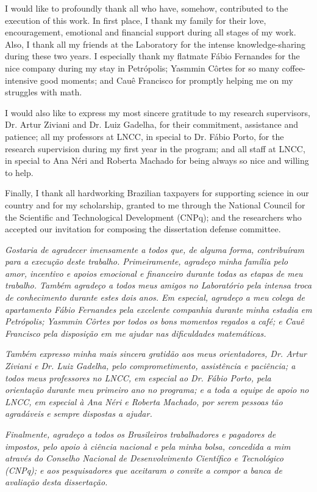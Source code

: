 \documentclass[
	12pt,				%
	openright,			%
	oneside,			%
	a4paper,			%
	sumario=tradicional,%
	french,				%
	spanish,			%
	brazil,				%
    english
	]{abntex2}
\begin{document}
\begin{agradecimentos}
I would like to profoundly thank all who have, somehow, contributed to the execution of this work.
In first place, I thank my family for their love, encouragement, emotional and financial support during all stages of my work.
Also, I thank all my friends at the Laboratory for the intense knowledge-sharing during these two years.
I especially thank my flatmate Fábio Fernandes for the nice company during my stay in Petrópolis; 
Yasmmin Côrtes for so many coffee-intensive good moments; 
and Cauê Francisco for promptly helping me on my struggles with math.

I would also like to express my most sincere gratitude to my research supervisors, Dr. Artur Ziviani and Dr. Luiz Gadelha, for their commitment, assistance and patience;
all my professors at LNCC, in special to Dr. Fábio Porto, for the research supervision during my first year in the program;
and all staff at LNCC, in special to Ana Néri and Roberta Machado for being always so nice and willing to help.

Finally, I thank all hardworking Brazilian taxpayers for supporting science in our country and for my scholarship, granted to me through the National Council for the Scientific and Technological Development (CNPq); and the researchers who accepted our invitation for composing the dissertation defense committee. 
\\[1\baselineskip]

\begin{footnotesize}
\textit{Gostaria de agradecer imensamente a todos que, de alguma forma, contribuíram para a execução deste trabalho.
Primeiramente, agradeço minha família pelo amor, incentivo e apoios emocional e financeiro durante todas as etapas de meu trabalho.
Também agradeço a todos meus amigos no Laboratório pela intensa troca de conhecimento durante estes dois anos.
Em especial, agradeço a meu colega de apartamento Fábio Fernandes pela excelente companhia durante minha estadia em Petrópolis;
Yasmmin Côrtes por todos os bons momentos regados a café;
e Cauê Francisco pela disposição em me ajudar nas dificuldades matemáticas.}

\textit{Também expresso minha mais sincera gratidão aos meus orientadores, Dr. Artur Ziviani e Dr. Luiz Gadelha, pelo comprometimento, assistência e paciência;
a todos meus professores no LNCC, em especial ao Dr. Fábio Porto, pela orientação durante meu primeiro ano no programa;
e a toda a equipe de apoio no LNCC, em especial à Ana Néri e Roberta Machado, por serem pessoas tão agradáveis e sempre dispostas a ajudar.}


\textit{Finalmente, agradeço a todos os Brasileiros trabalhadores e pagadores de impostos, pelo apoio à ciência nacional e pela minha bolsa, concedida a mim através do Conselho Nacional de Desenvolvimento Científico e Tecnológico (CNPq); e aos pesquisadores que aceitaram o convite a compor a banca de avaliação desta dissertação.}
\end{footnotesize}

\end{agradecimentos}
\end{document}
